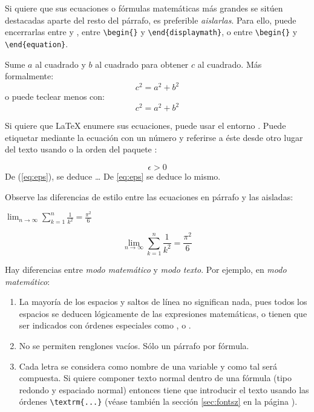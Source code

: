 Si quiere que sus ecuaciones o fórmulas matemáticas más grandes se sitúen destacadas aparte del resto del párrafo, es preferible \emph{aislarlas}.  Para ello, puede encerrarlas entre \ci{[} y \ci{]}, entre \verb|\begin{|\verb|}| y \verb|\end{displaymath}|, o entre \verb|\begin{|\verb|}| y \verb|\end{equation}|.
\begin{example}
Sume $a$ al cuadrado y $b$ al
cuadrado para obtener $c$ al
cuadrado.  Más formalmente:
\begin{displaymath}
c^{2}=a^{2}+b^{2}
\end{displaymath}
o puede teclear menos con:
\[c^2=a^2+b^2\]
\end{example}

Si quiere que \LaTeX{} enumere sus ecuaciones, puede usar el entorno .  Puede etiquetar mediante  la ecuación con un número y referirse a éste desde otro lugar del texto usando  o la orden  del paquete :
\begin{example}
\begin{equation} \label{eq:eps}
\epsilon > 0
\end{equation}
De (\ref{eq:eps}), se deduce
\ldots{} De \eqref{eq:eps} 
se deduce lo mismo.
\end{example}

Observe las diferencias de estilo entre las ecuaciones en párrafo y las aisladas:

\begin{example}
$\lim_{n \to \infty} 
\sum_{k=1}^n \frac{1}{k^2} 
= \frac{\pi^2}{6}$
\end{example}

\begin{example}
\begin{displaymath}
\lim_{n \to \infty} 
\sum_{k=1}^n \frac{1}{k^2} 
= \frac{\pi^2}{6}
\end{displaymath}
\end{example}


Hay diferencias entre \emph{modo matemático} y \emph{modo texto}.  Por ejemplo, en \emph{modo matemático}: 

\begin{enumerate}
\item La mayoría de los espacios y saltos de línea no significan nada, pues todos los espacios se deducen lógicamente de las expresiones matemáticas, o tienen que ser indicados con órdenes especiales como \ci{,},  o . 
\item No se permiten renglones vacíos. Sólo un párrafo por fórmula.
\item Cada letra se considera como nombre de una variable y como tal será compuesta.  Si quiere componer texto normal dentro de una fórmula (tipo redondo y espaciado normal) entonces tiene que introducir el texto usando las órdenes \verb|\textrm{...}| (véase también la sección \ref{sec:fontsz} en la página \pageref{sec:fontsz}).
\end{enumerate}

